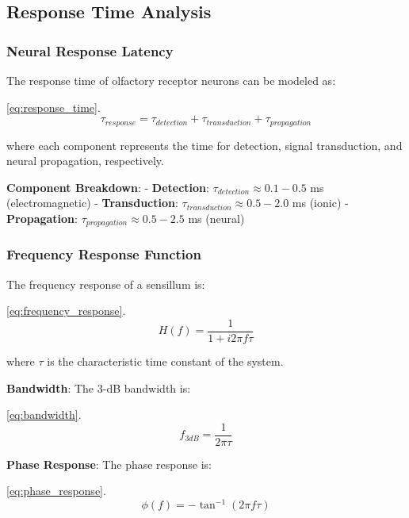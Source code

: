 \documentclass[
  13pt,
  a4paperpaper,
  12pt]{article}
\begin{document}
\subsection{Response Time Analysis}\label{response-time-analysis-1}

\subsubsection{Neural Response Latency}\label{neural-response-latency}

The response time of olfactory receptor neurons can be modeled as:

\eqref{eq:response_time}. \begin{equation}
\tau_{response} = \tau_{detection} + \tau_{transduction} + \tau_{propagation} \label{eq:response_time}
\end{equation}

where each component represents the time for detection, signal
transduction, and neural propagation, respectively.

\textbf{Component Breakdown}: - \textbf{Detection}:
\(\tau_{detection} \approx 0.1-0.5\) ms (electromagnetic) -
\textbf{Transduction}: \(\tau_{transduction} \approx 0.5-2.0\) ms
(ionic) - \textbf{Propagation}: \(\tau_{propagation} \approx 0.5-2.5\)
ms (neural)

\subsubsection{Frequency Response
Function}\label{frequency-response-function}

The frequency response of a sensillum is:

\eqref{eq:frequency_response}. \begin{equation}
H(f) = \frac{1}{1 + i2\pi f \tau} \label{eq:frequency_response}
\end{equation}

where \(\tau\) is the characteristic time constant of the system.

\textbf{Bandwidth}: The 3-dB bandwidth is:

\eqref{eq:bandwidth}. \begin{equation}
f_{3dB} = \frac{1}{2\pi \tau} \label{eq:bandwidth}
\end{equation}

\textbf{Phase Response}: The phase response is:

\eqref{eq:phase_response}. \begin{equation}
\phi(f) = -\tan^{-1}(2\pi f \tau) \label{eq:phase_response}
\end{equation}
\end{document}
